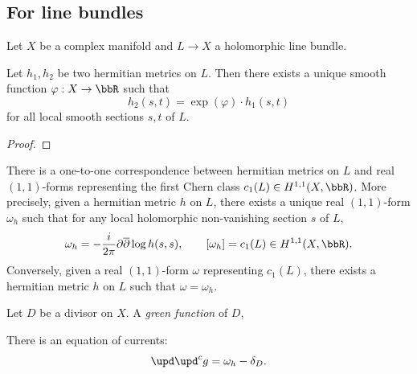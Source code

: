 


\subsection{For line bundles}

Let \(X\) be a complex manifold and \(L \to X\) a holomorphic line bundle.

\begin{proposition}\label{prop:hermitian_metric_different_by_a_smooth_function_on_a_fixed_line_bundle}
	Let \(h_1,h_2\) be two hermitian metrics on \(L\).
	Then there exists a unique smooth function \(\varphi: X \to \bbR\) such that
	\[h_2(s,t) = \exp(\varphi) \cdot h_1(s,t)\]
	for all local smooth sections \(s,t\) of \(L\).
\end{proposition}
\begin{proof}
\end{proof}

\begin{proposition}\label{prop:correspondence_between_hermitian_metric_and_forms}
	There is a one-to-one correspondence between hermitian metrics on \(L\) and real \((1,1)\)-forms representing the first Chern class \(c_1(L) \in H^{1,1}(X, \bbR)\).
	More precisely, given a hermitian metric \(h\) on \(L\), there exists a unique real \((1,1)\)-form \(\omega_h\) such that for any local holomorphic non-vanishing section \(s\) of \(L\),
	\[\omega_h = -\frac{i}{2\pi} \partial \overline{\partial} \log h(s,s), \qquad [\omega_h] = c_1(L) \in H^{1,1}(X,\bbR).\]
	Conversely, given a real \((1,1)\)-form \(\omega\) representing \(c_1(L)\), there exists a hermitian metric \(h\) on \(L\) such that \(\omega = \omega_h\).
\end{proposition}


\begin{definition}\label{def:green-functions-for-a-divisor}
	Let $D$ be a divisor on $X$.
	A \emph{green function} of $D$,

\end{definition}

\begin{proposition}
	There is an equation of currents:
	\[ \upd \upd^c g = \omega_h - \delta_D. \]
\end{proposition}










